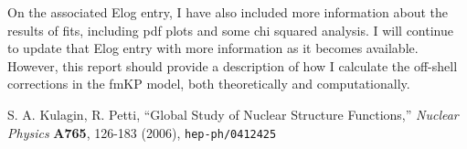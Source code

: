 \documentclass[12pt]{article}
\begin{document}
On the associated Elog entry, I have also included more information about the results of fits, including pdf plots and some chi squared analysis.  I will continue to update that Elog entry with more information as it becomes available.  However, this report should provide a description of how I calculate the off-shell corrections in the fmKP model, both theoretically and computationally.






\begin{thebibliography}{99}
 S. A. Kulagin, R. Petti, ``Global Study of Nuclear Structure Functions,'' \emph{Nuclear Physics} {\bf A765}, 126-183 (2006), \verb+hep-ph/0412425+
\end{thebibliography}
\end{document}
